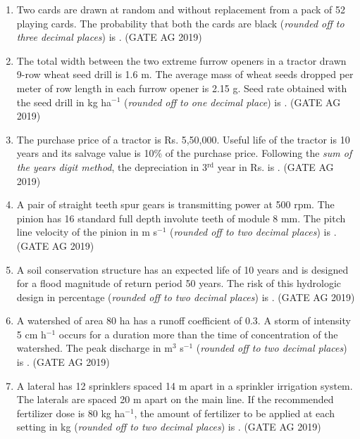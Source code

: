 \documentclass[journal,12pt,onecolumn]{IEEEtran}
\theoremstyle{remark}
\begin{document}
\begin{enumerate}
\item  Two cards are drawn at random and without replacement from a pack of 52 playing cards. The probability that both the cards are black (\textit{rounded off to three decimal places}) is \underline{\hspace{2cm}}.  
\hfill{(GATE AG 2019)}


\item  The total width between the two extreme furrow openers in a tractor drawn 9-row wheat seed drill is 1.6 m. The average mass of wheat seeds dropped per meter of row length in each furrow opener is 2.15 g. Seed rate obtained with the seed drill in kg ha$^{-1}$ (\textit{rounded off to one decimal place}) is \underline{\hspace{2cm}}.  
\hfill{(GATE AG 2019)}


\item  The purchase price of a tractor is Rs. 5,50,000. Useful life of the tractor is 10 years and its salvage value is 10\% of the purchase price. Following the \textit{sum of the years digit method}, the depreciation in 3$^{\text{rd}}$ year in Rs. is \underline{\hspace{2cm}}.  
\hfill{(GATE AG 2019)}


\item  A pair of straight teeth spur gears is transmitting power at 500 rpm. The pinion has 16 standard full depth involute teeth of module 8 mm. The pitch line velocity of the pinion in m s$^{-1}$ (\textit{rounded off to two decimal places}) is \underline{\hspace{2cm}}.  
\hfill{(GATE AG 2019)}


\item  A soil conservation structure has an expected life of 10 years and is designed for a flood magnitude of return period 50 years. The risk of this hydrologic design in percentage (\textit{rounded off to two decimal places}) is \underline{\hspace{2cm}}.  
\hfill{(GATE AG 2019)}


\item  A watershed of area 80 ha has a runoff coefficient of 0.3. A storm of intensity 5 cm h$^{-1}$ occurs for a duration more than the time of concentration of the watershed. The peak discharge in m$^3$ s$^{-1}$ (\textit{rounded off to two decimal places}) is \underline{\hspace{2cm}}.  
\hfill{(GATE AG 2019)}

\item 
A lateral has 12 sprinklers spaced 14 m apart in a sprinkler irrigation system. The laterals are spaced 20 m apart on the main line. If the recommended fertilizer dose is 80 kg ha$^{-1}$, the amount of fertilizer to be applied at each setting in kg (\textit{rounded off to two decimal places}) is \underline{\hspace{2cm}}.
\hfill{(GATE AG 2019)}


\end{enumerate}
\end{document}
